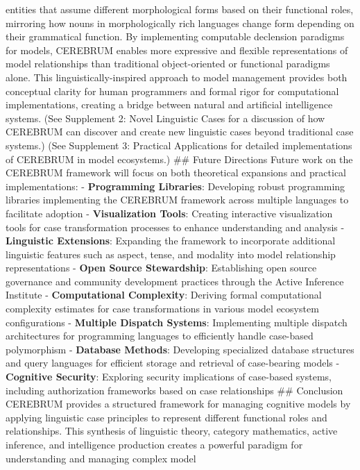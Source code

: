 \documentclass[
  11pt,
  letterpaper,
]{article}
\begin{document}
entities that assume different morphological forms based on their
functional roles, mirroring how nouns in morphologically rich languages
change form depending on their grammatical function. By implementing
computable declension paradigms for models, CEREBRUM enables more
expressive and flexible representations of model relationships than
traditional object-oriented or functional paradigms alone. This
linguistically-inspired approach to model management provides both
conceptual clarity for human programmers and formal rigor for
computational implementations, creating a bridge between natural and
artificial intelligence systems. (See Supplement 2: Novel Linguistic
Cases for a discussion of how CEREBRUM can discover and create new
linguistic cases beyond traditional case systems.) (See Supplement 3:
Practical Applications for detailed implementations of CEREBRUM in model
ecosystems.) \#\# Future Directions Future work on the CEREBRUM
framework will focus on both theoretical expansions and practical
implementations: - \textbf{Programming Libraries}: Developing robust
programming libraries implementing the CEREBRUM framework across
multiple languages to facilitate adoption - \textbf{Visualization
Tools}: Creating interactive visualization tools for case transformation
processes to enhance understanding and analysis - \textbf{Linguistic
Extensions}: Expanding the framework to incorporate additional
linguistic features such as aspect, tense, and modality into model
relationship representations - \textbf{Open Source Stewardship}:
Establishing open source governance and community development practices
through the Active Inference Institute - \textbf{Computational
Complexity}: Deriving formal computational complexity estimates for case
transformations in various model ecosystem configurations -
\textbf{Multiple Dispatch Systems}: Implementing multiple dispatch
architectures for programming languages to efficiently handle case-based
polymorphism - \textbf{Database Methods}: Developing specialized
database structures and query languages for efficient storage and
retrieval of case-bearing models - \textbf{Cognitive Security}:
Exploring security implications of case-based systems, including
authorization frameworks based on case relationships \#\# Conclusion
CEREBRUM provides a structured framework for managing cognitive models
by applying linguistic case principles to represent different functional
roles and relationships. This synthesis of linguistic theory, category
mathematics, active inference, and intelligence production creates a
powerful paradigm for understanding and managing complex model
\end{document}
